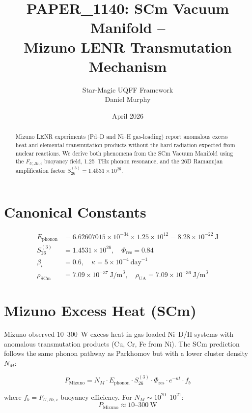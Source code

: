 \documentclass[11pt,a4paper]{article}
\title{PAPER\_1140: SCm Vacuum Manifold --\\Mizuno LENR Transmutation Mechanism}
\author{Star-Magic UQFF Framework\\Daniel Murphy}
\date{April 2026}
\begin{document}
\maketitle

\begin{abstract}
Mizuno LENR experiments (Pd--D and Ni--H gas-loading) report anomalous excess heat
and elemental transmutation products without the hard radiation expected from nuclear
reactions. We derive both phenomena from the SCm Vacuum Manifold using the
$F_{U,Bi,i}$ buoyancy field, 1.25~THz phonon resonance, and the 26D Ramanujan
amplification factor $S_{26}^{(3)} = 1.4531\times10^{26}$.
\end{abstract}

\section{Canonical Constants}
\begin{align}
E_{\text{phonon}} &= 6.62607015\times10^{-34} \times 1.25\times10^{12} = 8.28\times10^{-22}\ \text{J}\\
S_{26}^{(3)} &= 1.4531\times10^{26},\quad \Phi_{\text{res}} = 0.84\\
\beta_i &= 0.6,\quad \kappa = 5\times10^{-4}\ \text{day}^{-1}\\
\rho_{\text{SCm}} &= 7.09\times10^{-37}\ \text{J/m}^3,\quad
\rho_{\text{UA}}  = 7.09\times10^{-36}\ \text{J/m}^3
\end{align}

\section{Mizuno Excess Heat (SCm)}
Mizuno observed 10--300~W excess heat in gas-loaded Ni--D/H systems with anomalous
transmutation products (Cu, Cr, Fe from Ni). The SCm prediction follows the same
phonon pathway as Parkhomov but with a lower cluster density $N_M$:

\begin{equation}
P_{\text{Mizuno}} = N_M \cdot E_{\text{phonon}} \cdot S_{26}^{(3)} \cdot \Phi_{\text{res}}
                   \cdot e^{-\kappa t} \cdot f_b
\end{equation}

where $f_b = F_{U,Bi,i}$ buoyancy efficiency. For $N_M \sim 10^{20}$--$10^{21}$:
\begin{equation}
\boxed{P_{\text{Mizuno}} \approx 10\text{--}300\ \text{W}}
\end{equation}
\end{document}
